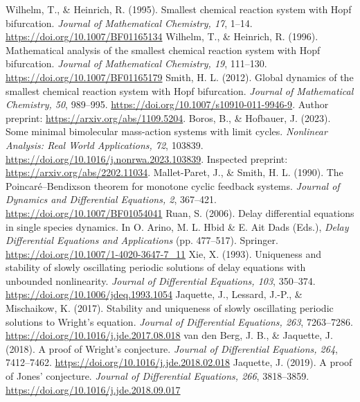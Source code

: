  Wilhelm, T., \& Heinrich, R. (1995). Smallest chemical reaction system with Hopf bifurcation. \emph{Journal of Mathematical Chemistry, 17}, 1--14. \url{https://doi.org/10.1007/BF01165134}
 Wilhelm, T., \& Heinrich, R. (1996). Mathematical analysis of the smallest chemical reaction system with Hopf bifurcation. \emph{Journal of Mathematical Chemistry, 19}, 111--130. \url{https://doi.org/10.1007/BF01165179}
 Smith, H. L. (2012). Global dynamics of the smallest chemical reaction system with Hopf bifurcation. \emph{Journal of Mathematical Chemistry, 50}, 989--995. \url{https://doi.org/10.1007/s10910-011-9946-9}. Author preprint: \url{https://arxiv.org/abs/1109.5204}.
 Boros, B., \& Hofbauer, J. (2023). Some minimal bimolecular mass-action systems with limit cycles. \emph{Nonlinear Analysis: Real World Applications, 72}, 103839. \url{https://doi.org/10.1016/j.nonrwa.2023.103839}. Inspected preprint: \url{https://arxiv.org/abs/2202.11034}.
 Mallet-Paret, J., \& Smith, H. L. (1990). The Poincar\'e--Bendixson theorem for monotone cyclic feedback systems. \emph{Journal of Dynamics and Differential Equations, 2}, 367--421. \url{https://doi.org/10.1007/BF01054041}
 Ruan, S. (2006). Delay differential equations in single species dynamics. In O. Arino, M. L. Hbid \& E. Ait Dads (Eds.), \emph{Delay Differential Equations and Applications} (pp. 477--517). Springer. \url{https://doi.org/10.1007/1-4020-3647-7_11}
 Xie, X. (1993). Uniqueness and stability of slowly oscillating periodic solutions of delay equations with unbounded nonlinearity. \emph{Journal of Differential Equations, 103}, 350--374. \url{https://doi.org/10.1006/jdeq.1993.1054}
 Jaquette, J., Lessard, J.-P., \& Mischaikow, K. (2017). Stability and uniqueness of slowly oscillating periodic solutions to Wright's equation. \emph{Journal of Differential Equations, 263}, 7263--7286. \url{https://doi.org/10.1016/j.jde.2017.08.018}
 van den Berg, J. B., \& Jaquette, J. (2018). A proof of Wright's conjecture. \emph{Journal of Differential Equations, 264}, 7412--7462. \url{https://doi.org/10.1016/j.jde.2018.02.018}
 Jaquette, J. (2019). A proof of Jones' conjecture. \emph{Journal of Differential Equations, 266}, 3818--3859. \url{https://doi.org/10.1016/j.jde.2018.09.017}
